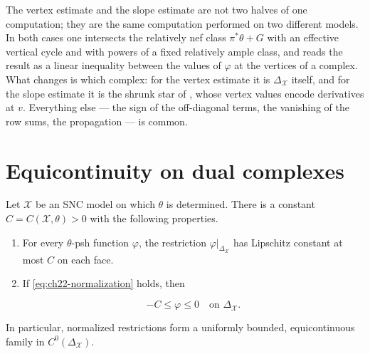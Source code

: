 \begin{remark}
\label{rem:ch22-estimates-together}
The vertex estimate and the slope estimate are not two halves of one
computation; they are the same computation performed on two different
models.  In both cases one intersects the relatively nef class
\(\pi^*\theta+G\) with an effective vertical cycle and with powers of a
fixed relatively ample class, and reads the result as a linear inequality
between the values of \(\varphi\) at the vertices of a complex.  What
changes is which complex: for the vertex estimate it is
\(\Delta_{\mathcal X}\) itself, and for the slope estimate it is the shrunk
star of , whose vertex values encode
derivatives at \(v\).  Everything else --- the sign of the off-diagonal
terms, the vanishing of the row sums, the propagation --- is common.
\end{remark}

\section{Equicontinuity on dual complexes}
\label{sec:ch22-equicontinuity}

\begin{theorem}\label{thm:bfj-skeletal-equicontinuity}
Let \(\mathcal X\) be an SNC model on which \(\theta\) is determined.  There
is a constant \(C=C(\mathcal X,\theta)>0\) with the following properties.

\begin{enumerate}
\item For every \(\theta\)-psh function \(\varphi\), the restriction
\(\varphi|_{\Delta_{\mathcal X}}\) has Lipschitz constant at most \(C\) on
each face.
\item If \eqref{eq:ch22-normalization} holds, then

\[
                  -C\leq\varphi\leq0
                  \quad\text{on }\Delta_{\mathcal X}.
\tag{22.52}\label{eq:ch22-skeletal-bound}
\]
\end{enumerate}

In particular, normalized restrictions form a uniformly bounded,
equicontinuous family in \(C^0(\Delta_{\mathcal X})\).
\end{theorem}

